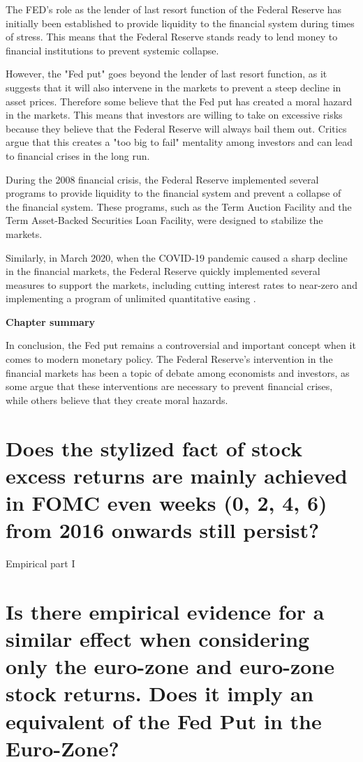 The FED's role as the lender of last resort function of the Federal Reserve has initially been established to provide liquidity to the financial system during times of stress.  \parencite{Holland91}
This means that the Federal Reserve stands ready to lend money to financial institutions to prevent systemic collapse. 

However, the "Fed put" goes beyond the lender of last resort function,  as it suggests that it will also intervene in the markets to prevent a steep decline in asset prices.
Therefore some believe that the Fed put has created a moral hazard in the markets.  \parencite{WSJ7} 
This means that investors are willing to take on excessive risks because they believe that the Federal Reserve will always bail them out.  
Critics argue that this creates a "too big to fail" mentality among investors and can lead to financial crises in the long run. 

During the 2008 financial crisis,  the Federal Reserve implemented several programs to provide liquidity to the financial system and prevent a collapse of the financial system. 
These programs,  such as the Term Auction Facility and the Term Asset-Backed Securities Loan Facility,  were designed to stabilize the markets.  

Similarly,  in March 2020, when the COVID-19 pandemic caused a sharp decline in the financial markets,  the Federal Reserve quickly implemented several measures to support the markets,  including cutting interest rates to near-zero and implementing a program of unlimited quantitative easing \parencite{FED21}.


\textbf{Chapter summary}

In conclusion,  the Fed put remains a controversial and important concept when it comes to modern monetary policy.  
The Federal Reserve's intervention in the financial markets has been a topic of debate among economists and investors,  as some argue that these interventions are necessary to prevent financial crises,  while others believe that they create moral hazards. 

\chapter{Does the stylized fact of stock excess returns are mainly achieved in FOMC even weeks (0,  2,  4,  6) from 2016 onwards still persist?}

Empirical part I

\chapter{Is there empirical evidence for a similar effect when considering only the euro-zone and euro-zone stock returns.  Does it imply an equivalent of the Fed Put in the Euro-Zone?}

